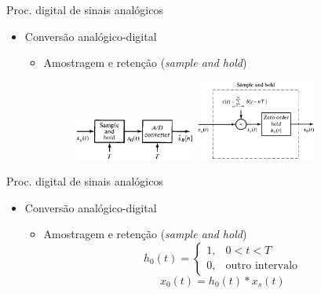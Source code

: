 \begin{slide}{Proc. digital de sinais anal\'ogicos}
\begin{itemize}
   \item Conversão analógico-digital
   \begin{itemize}
      \item Amostragem e retenção (\emph{sample and hold})
      \begin{figure}
         \centering
          \includegraphics[width = 0.4\textwidth]{figs/ad_conv1.eps}
          \includegraphics[width = 0.4\textwidth]{figs/ad_conv2.eps}
      \end{figure}

   \end{itemize}
\end{itemize}
\end{slide}

\begin{slide}{Proc. digital de sinais anal\'ogicos}
\begin{itemize}
   \item Conversão analógico-digital
   \begin{itemize}
      \item Amostragem e retenção (\emph{sample and hold})
      \begin{equation}
          h_0(t) = \begin{cases} 1, & 0<t<T\\0, & \text{outro intervalo}\end{cases}
      \end{equation}
      \begin{equation}
          x_0(t) = h_0(t)\ast x_s(t)
      \end{equation}
   \end{itemize}
\end{itemize}
\end{slide}

